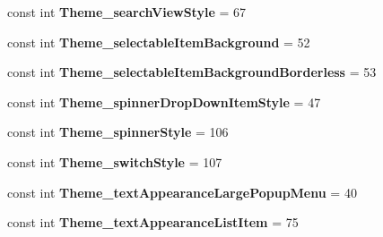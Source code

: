 \begin{DoxyCompactItemize}
\item 
\hypertarget{classClient_1_1Droid_1_1Resource_1_1Styleable_adf5373a9cdf2e7afd053111e3766e3d9}{}const int {\bfseries Theme\+\_\+search\+View\+Style} = 67\label{classClient_1_1Droid_1_1Resource_1_1Styleable_adf5373a9cdf2e7afd053111e3766e3d9}

\item 
\hypertarget{classClient_1_1Droid_1_1Resource_1_1Styleable_a85bdd4693e7be7323515fa29879a9da6}{}const int {\bfseries Theme\+\_\+selectable\+Item\+Background} = 52\label{classClient_1_1Droid_1_1Resource_1_1Styleable_a85bdd4693e7be7323515fa29879a9da6}

\item 
\hypertarget{classClient_1_1Droid_1_1Resource_1_1Styleable_aa0e38daec24e27935c4b3b678b427e76}{}const int {\bfseries Theme\+\_\+selectable\+Item\+Background\+Borderless} = 53\label{classClient_1_1Droid_1_1Resource_1_1Styleable_aa0e38daec24e27935c4b3b678b427e76}

\item 
\hypertarget{classClient_1_1Droid_1_1Resource_1_1Styleable_ae3e0a35e906cbc73d211e3b5f8a85d9c}{}const int {\bfseries Theme\+\_\+spinner\+Drop\+Down\+Item\+Style} = 47\label{classClient_1_1Droid_1_1Resource_1_1Styleable_ae3e0a35e906cbc73d211e3b5f8a85d9c}

\item 
\hypertarget{classClient_1_1Droid_1_1Resource_1_1Styleable_a2b54a7e735c0c696054b59184ed46816}{}const int {\bfseries Theme\+\_\+spinner\+Style} = 106\label{classClient_1_1Droid_1_1Resource_1_1Styleable_a2b54a7e735c0c696054b59184ed46816}

\item 
\hypertarget{classClient_1_1Droid_1_1Resource_1_1Styleable_a7a3e6eb853b500d8bcbad18aebaddad4}{}const int {\bfseries Theme\+\_\+switch\+Style} = 107\label{classClient_1_1Droid_1_1Resource_1_1Styleable_a7a3e6eb853b500d8bcbad18aebaddad4}

\item 
\hypertarget{classClient_1_1Droid_1_1Resource_1_1Styleable_a6b3fe1211c256416f6b1bac002d8c2dc}{}const int {\bfseries Theme\+\_\+text\+Appearance\+Large\+Popup\+Menu} = 40\label{classClient_1_1Droid_1_1Resource_1_1Styleable_a6b3fe1211c256416f6b1bac002d8c2dc}

\item 
\hypertarget{classClient_1_1Droid_1_1Resource_1_1Styleable_a2743dfdea8b85fb30666d062c16694d0}{}const int {\bfseries Theme\+\_\+text\+Appearance\+List\+Item} = 75\label{classClient_1_1Droid_1_1Resource_1_1Styleable_a2743dfdea8b85fb30666d062c16694d0}


\end{DoxyCompactItemize}
